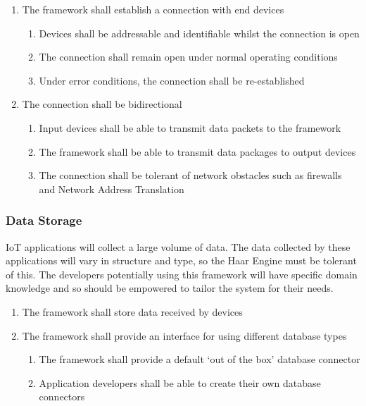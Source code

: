         \begin{enumerate}
          \item The framework shall establish a connection with end devices
          \begin{enumerate}
            \item Devices shall be addressable and identifiable whilst the connection is open
            \item The connection shall remain open under normal operating conditions
            \item Under error conditions, the connection shall be re-established
          \end{enumerate}
          \item The connection shall be bidirectional
          \begin{enumerate}
            \item Input devices shall be able to transmit data packets to the framework
            \item The framework shall be able to transmit data packages to output devices
            \item The connection shall be tolerant of network obstacles such as firewalls and Network Address Translation
          \end{enumerate}
        \end{enumerate}

      \subsubsection{Data Storage}
        IoT applications will collect a large volume of data. The data collected by these applications will vary in structure and type, so the Haar Engine must be tolerant of this. The developers potentially using this framework will have specific domain knowledge and so should be empowered to tailor the system for their needs.

        \begin{enumerate}
          \item The framework shall store data received by devices
          \item The framework shall provide an interface for using different database types
          \begin{enumerate}
            \item The framework shall provide a default `out of the box' database connector
            \item Application developers shall be able to create their own database connectors
          \end{enumerate}
        \end{enumerate}

